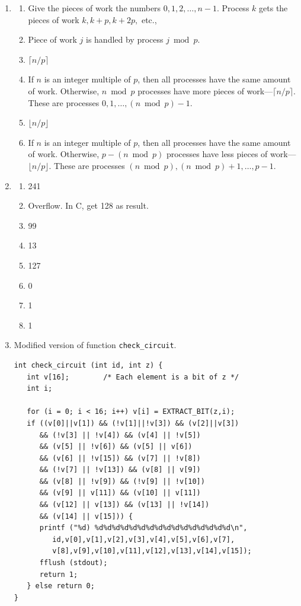 \begin{enumerate}
\item \begin{enumerate}
      \item Give the pieces of work the numbers $0, 1, 2, \ldots, n-1$.
            Process $k$ gets the pieces of work $k, k + p, k + 2p,$ etc.,
      \item Piece of work $j$ is handled by process $j \bmod p$.
      \item $\lceil n/p\rceil$
      \item If $n$ is an integer multiple of $p$, then all processes have
            the same amount of work. Otherwise, $n \bmod p$ processes have
            more pieces of work---$\lceil n/p\rceil$. These are
            processes $0, 1, \ldots, (n \bmod p)-1$.
      \item $\lfloor n/p\rfloor$
      \item If $n$ is an integer multiple of $p$, then all processes have
            the same amount of work. Otherwise, $p - (n \bmod p)$ processes have
            less pieces of work---$\lfloor n/p\rfloor$. These are
            processes $(n \bmod p), (n \bmod p)+1, \ldots, p-1$.
      \end{enumerate}

\item \begin{enumerate}
      \item 241
      \item Overflow. In C, get 128 as result.
      \item 99
      \item 13
      \item 127
      \item 0
      \item 1
      \item 1
      \end{enumerate}

\item Modified version of function {\tt check\_circuit}.

\begin{verbatim}
int check_circuit (int id, int z) {
   int v[16];        /* Each element is a bit of z */
   int i;

   for (i = 0; i < 16; i++) v[i] = EXTRACT_BIT(z,i);
   if ((v[0]||v[1]) && (!v[1]||!v[3]) && (v[2]||v[3])
      && (!v[3] || !v[4]) && (v[4] || !v[5])
      && (v[5] || !v[6]) && (v[5] || v[6])
      && (v[6] || !v[15]) && (v[7] || !v[8])
      && (!v[7] || !v[13]) && (v[8] || v[9])
      && (v[8] || !v[9]) && (!v[9] || !v[10])
      && (v[9] || v[11]) && (v[10] || v[11])
      && (v[12] || v[13]) && (v[13] || !v[14])
      && (v[14] || v[15])) {
      printf ("%d) %d%d%d%d%d%d%d%d%d%d%d%d%d%d%d%d\n",
         id,v[0],v[1],v[2],v[3],v[4],v[5],v[6],v[7],
         v[8],v[9],v[10],v[11],v[12],v[13],v[14],v[15]);
      fflush (stdout);
      return 1;
   } else return 0;
}
\end{verbatim}


\end{enumerate}
